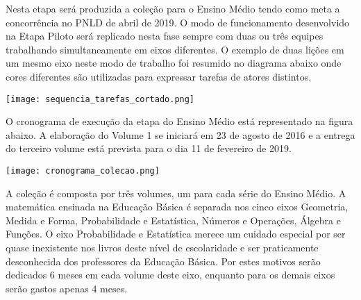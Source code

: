\documentclass[10 pt]{article}
\begin{document}
Nesta etapa será produzida a coleção para o Ensino Médio tendo como meta a concorrência no PNLD de abril de 2019.
O modo de funcionamento desenvolvido na Etapa Piloto será replicado nesta fase sempre com duas ou três equipes trabalhando simultaneamente em eixos diferentes.
O exemplo de duas lições em um mesmo eixo neste modo de trabalho foi resumido no diagrama abaixo onde cores diferentes são utilizadas para expressar tarefas de atores distintos.

\noindent\texttt{[image: sequencia\_tarefas\_cortado.png]}

O cronograma de execução da etapa do Ensino Médio está representado na figura abaixo. A elaboração do Volume 1 se iniciará em 23 de agosto de 2016 e a entrega do terceiro volume está prevista para o dia 11 de fevereiro de 2019.

\noindent\texttt{[image: cronograma\_colecao.png]}
\vspace{0.2 cm}

A coleção é composta por três volumes, um para cada série do Ensino Médio. A matemática ensinada na Educação Básica é separada nos cinco eixos  Geometria, Medida e Forma, Probabilidade e Estatística, Números e Operações, Álgebra e Funções. O eixo Probabilidade e Estatística merece um cuidado especial por ser quase inexistente nos livros deste nível de escolaridade e ser praticamente desconhecida dos professores da Educação Básica. Por estes motivos serão dedicados 6 meses em cada volume deste eixo, enquanto para os demais eixos serão gastos apenas 4 meses.




 
\end{document}
